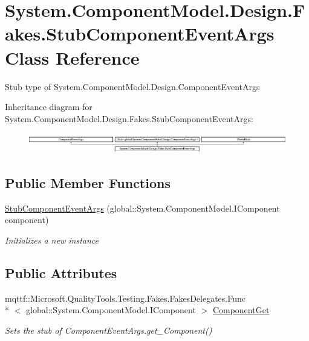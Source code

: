 \hypertarget{class_system_1_1_component_model_1_1_design_1_1_fakes_1_1_stub_component_event_args}{\section{System.\-Component\-Model.\-Design.\-Fakes.\-Stub\-Component\-Event\-Args Class Reference}
\label{class_system_1_1_component_model_1_1_design_1_1_fakes_1_1_stub_component_event_args}
}


Stub type of System.\-Component\-Model.\-Design.\-Component\-Event\-Args 


Inheritance diagram for System.\-Component\-Model.\-Design.\-Fakes.\-Stub\-Component\-Event\-Args\-:\begin{figure}[H]
\begin{center}
\leavevmode
\includegraphics[height=0.886778cm]{class_system_1_1_component_model_1_1_design_1_1_fakes_1_1_stub_component_event_args}
\end{center}
\end{figure}
\subsection*{Public Member Functions}
\begin{DoxyCompactItemize}
\item 
\hyperlink{class_system_1_1_component_model_1_1_design_1_1_fakes_1_1_stub_component_event_args_ae3199245709f42e226e47210e5ae201f}{Stub\-Component\-Event\-Args} (global\-::\-System.\-Component\-Model.\-I\-Component component)
\begin{DoxyCompactList}\small\item\em Initializes a new instance\end{DoxyCompactList}\end{DoxyCompactItemize}
\subsection*{Public Attributes}
\begin{DoxyCompactItemize}
\item 
mqttf\-::\-Microsoft.\-Quality\-Tools.\-Testing.\-Fakes.\-Fakes\-Delegates.\-Func\\*
$<$ global\-::\-System.\-Component\-Model.\-I\-Component $>$ \hyperlink{class_system_1_1_component_model_1_1_design_1_1_fakes_1_1_stub_component_event_args_a5240fcca0f4b31ed49e80c7e6f058dad}{Component\-Get}
\begin{DoxyCompactList}\small\item\em Sets the stub of Component\-Event\-Args.\-get\-\_\-\-Component()\end{DoxyCompactList}\end{DoxyCompactItemize}

